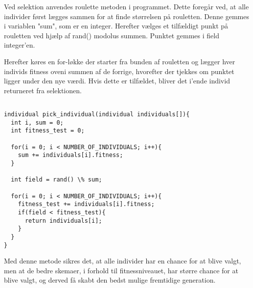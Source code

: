 Ved selektion anvendes roulette metoden i programmet. Dette foregår ved, at alle individer først lægges sammen for at finde størrelsen på rouletten. Denne gemmes i variablen "sum", som er en integer. Herefter vælges et tilfældigt punkt på rouletten ved hjælp af rand() modolus summen. Punktet gemmes i field integer'en.

Herefter køres en for-løkke der starter fra bunden af rouletten og lægger hver individs fitness oveni summen af de forrige, hvorefter der tjekkes om punktet ligger under den nye værdi. Hvis dette er tilfældet, bliver det i'ende individ returneret fra selektionen.  

\begin{lstlisting}[langueage=c]

individual pick_individual(individual individuals[]){
  int i, sum = 0;
  int fitness_test = 0;

  for(i = 0; i < NUMBER_OF_INDIVIDUALS; i++){
    sum += individuals[i].fitness;
  }

  int field = rand() \% sum;

  for(i = 0; i < NUMBER_OF_INDIVIDUALS; i++){
    fitness_test += individuals[i].fitness;
    if(field < fitness_test){
      return individuals[i];
    }
  }
}

\end{lstlisting}

Med denne metode sikres det, at alle individer har en chance for at blive valgt, men at de bedre skemaer, i forhold til fitnessniveauet, har større chance for at blive valgt, og derved få skabt den bedst mulige fremtidige generation.